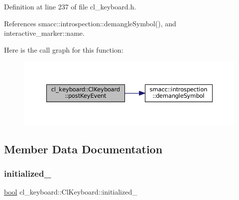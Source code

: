 Definition at line 237 of file cl\+\_\+keyboard.\+h.



References smacc\+::introspection\+::demangle\+Symbol(), and interactive\+\_\+marker\+::name.


Here is the call graph for this function\+:
\nopagebreak
\begin{figure}[H]
\begin{center}
\leavevmode
\includegraphics[width=350pt]{classcl__keyboard_1_1ClKeyboard_ac1311ce9a6a64e590df2e1b088f0e733_cgraph}
\end{center}
\end{figure}


\subsection{Member Data Documentation}
\mbox{\label{classcl__keyboard_1_1ClKeyboard_a96128ed5180e0dc5cfe76c90a9f8e8f7}} 
\subsubsection{\texorpdfstring{initialized\+\_\+}{initialized\_}}
{\footnotesize\ttfamily \hyperlink{classbool}{bool} cl\+\_\+keyboard\+::\+Cl\+Keyboard\+::initialized\+\_\+\hspace{0.3cm}{\ttfamily [private]}}



